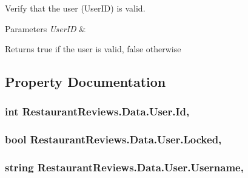 Verify that the user (User\+ID) is valid. 


\begin{DoxyParams}{Parameters}
{\em User\+ID} & \\
\hline
\end{DoxyParams}
\begin{DoxyReturn}{Returns}
true if the user is valid, false otherwise
\end{DoxyReturn}


\subsection{Property Documentation}
\subsubsection[{\texorpdfstring{Id}{Id}}]{\setlength{\rightskip}{0pt plus 5cm}int Restaurant\+Reviews.\+Data.\+User.\+Id\hspace{0.3cm}{\ttfamily [get]}, {\ttfamily [set]}}\hypertarget{class_restaurant_reviews_1_1_data_1_1_user_a4ba58b39b7d5ee1669ed59236d5c82a6}{}\label{class_restaurant_reviews_1_1_data_1_1_user_a4ba58b39b7d5ee1669ed59236d5c82a6}
\subsubsection[{\texorpdfstring{Locked}{Locked}}]{\setlength{\rightskip}{0pt plus 5cm}bool Restaurant\+Reviews.\+Data.\+User.\+Locked\hspace{0.3cm}{\ttfamily [get]}, {\ttfamily [set]}}\hypertarget{class_restaurant_reviews_1_1_data_1_1_user_a697babda5d94389397c64acf50bf8937}{}\label{class_restaurant_reviews_1_1_data_1_1_user_a697babda5d94389397c64acf50bf8937}
\subsubsection[{\texorpdfstring{Username}{Username}}]{\setlength{\rightskip}{0pt plus 5cm}string Restaurant\+Reviews.\+Data.\+User.\+Username\hspace{0.3cm}{\ttfamily [get]}, {\ttfamily [set]}}\hypertarget{class_restaurant_reviews_1_1_data_1_1_user_adecb7ed110e15ef004cc6fc274e22014}{}\label{class_restaurant_reviews_1_1_data_1_1_user_adecb7ed110e15ef004cc6fc274e22014}


